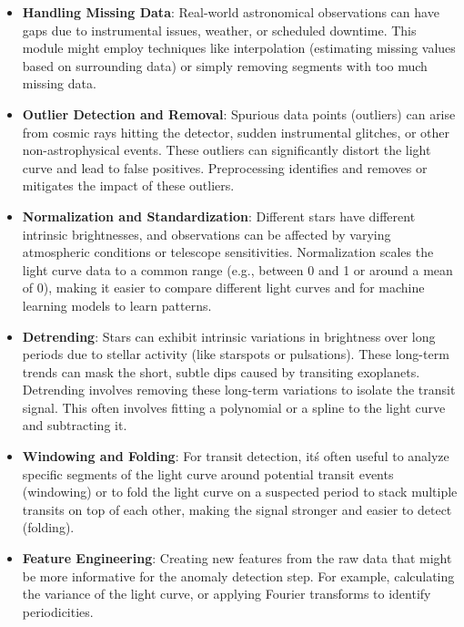 \documentclass{article}
\begin{document}
\begin{itemize}
    \item \textbf{Handling Missing Data}: Real-world astronomical observations can have gaps due to instrumental issues, weather, or scheduled downtime. This module might employ techniques like interpolation (estimating missing values based on surrounding data) or simply removing segments with too much missing data.

    \item \textbf{Outlier Detection and Removal}: Spurious data points (outliers) can arise from cosmic rays hitting the detector, sudden instrumental glitches, or other non-astrophysical events. These outliers can significantly distort the light curve and lead to false positives. Preprocessing identifies and removes or mitigates the impact of these outliers.

    \item \textbf{Normalization and Standardization}: Different stars have different intrinsic brightnesses, and observations can be affected by varying atmospheric conditions or telescope sensitivities. Normalization scales the light curve data to a common range (e.g., between 0 and 1 or around a mean of 0), making it easier to compare different light curves and for machine learning models to learn patterns.

    \item \textbf{Detrending}: Stars can exhibit intrinsic variations in brightness over long periods due to stellar activity (like starspots or pulsations). These long-term trends can mask the short, subtle dips caused by transiting exoplanets. Detrending involves removing these long-term variations to isolate the transit signal. This often involves fitting a polynomial or a spline to the light curve and subtracting it.

    \item \textbf{Windowing and Folding}: For transit detection, it\'s often useful to analyze specific segments of the light curve around potential transit events (windowing) or to fold the light curve on a suspected period to stack multiple transits on top of each other, making the signal stronger and easier to detect (folding).

    \item \textbf{Feature Engineering}: Creating new features from the raw data that might be more informative for the anomaly detection step. For example, calculating the variance of the light curve, or applying Fourier transforms to identify periodicities.
\end{itemize}
\end{document}
